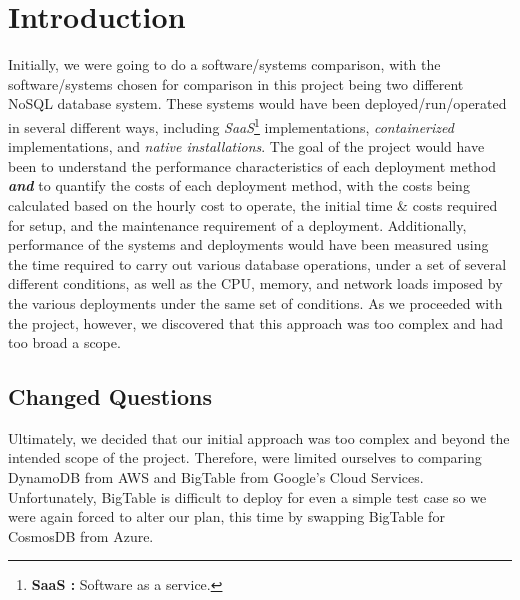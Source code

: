 \section{Introduction}

Initially, we were going to do a software/systems comparison, with the software/systems chosen for comparison in this project being two different NoSQL database system.  These systems would have been deployed/run/operated in several different ways, including \emph{SaaS}\footnote{\textbf{SaaS :} Software as a service.} implementations, \emph{containerized} implementations, and \emph{native installations}.  The goal of the project would have been to understand the performance characteristics of each deployment method \emph{\textbf{and}} to quantify the costs of each deployment method, with the costs being calculated based on the hourly cost to operate, the initial time \& costs required for setup, and the maintenance requirement of a deployment.  Additionally, performance of the systems and deployments would have been measured using the time required to carry out various database operations, under a set of several different conditions, as well as the CPU, memory, and network loads imposed by the various deployments under the same set of conditions. As we proceeded with the project, however, we discovered that this approach was too complex and had too broad a scope.



\subsection{Changed Questions}

Ultimately, we decided that our initial approach was too complex and beyond the intended scope of the project.  Therefore, were limited ourselves to comparing DynamoDB from AWS and BigTable from Google's Cloud Services.  Unfortunately, BigTable is difficult to deploy for even a simple test case so we were again forced to alter our plan, this time by swapping BigTable for CosmosDB from Azure.




























